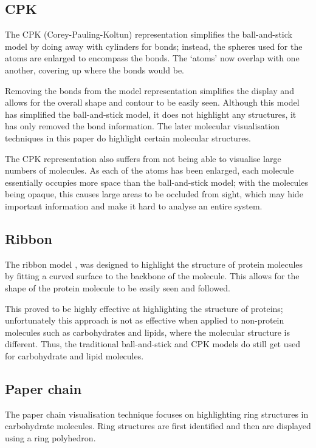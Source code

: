 \documentclass[a4paper]{article}
\begin{document}
\subsection*{CPK}
The CPK (Corey-Pauling-Koltun) \citep{corey53} representation simplifies the
ball-and-stick model by doing away with cylinders for bonds; instead, the
spheres used for the atoms are enlarged to encompass the bonds. The `atoms' now
overlap with one another, covering up where the bonds would be.

Removing the bonds from the model representation simplifies the display and
allows for the overall shape and contour to be easily seen. Although this model
has simplified the ball-and-stick model, it does not highlight any structures,
it has only removed the bond information. The later molecular visualisation
techniques in this paper do highlight certain molecular structures.

The CPK representation also suffers from not being able to visualise large
numbers of molecules. As each of the atoms has been enlarged, each molecule
essentially occupies more space than the ball-and-stick model; with the
molecules being opaque, this causes large areas to be occluded from sight, which
may hide important information and make it hard to analyse an entire system.

\subsection*{Ribbon}
The ribbon model \citep{richardson81}, \citep{carson87} was designed to
highlight the structure of protein molecules by fitting a curved surface to the
backbone of the molecule. This allows for the shape of the protein molecule to
be easily seen and followed.

This proved to be highly effective at highlighting the structure of proteins;
unfortunately this approach is not as effective when applied to non-protein
molecules such as carbohydrates and lipids, where the molecular structure is
different. Thus, the traditional ball-and-stick and CPK models do still get
used for carbohydrate and lipid molecules.

\subsection*{Paper chain}
The paper chain visualisation technique \citep{kuttel06} focuses on highlighting
ring structures in carbohydrate molecules. Ring structures are first identified
and then are displayed using a ring polyhedron.
\end{document}

